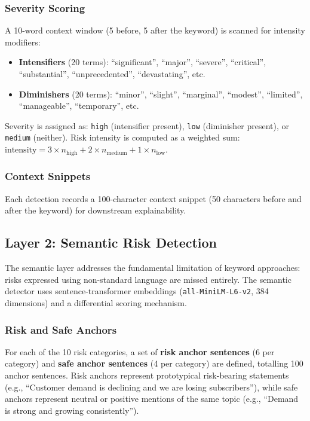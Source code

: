 \documentclass[12pt,a4paper]{article}
\begin{document}
\subsubsection{Severity Scoring}

A 10-word context window (5 before, 5 after the keyword) is scanned for intensity modifiers:
\begin{itemize}[noitemsep]
    \item \textbf{Intensifiers} (20 terms): ``significant'', ``major'', ``severe'', ``critical'', ``substantial'', ``unprecedented'', ``devastating'', etc.
    \item \textbf{Diminishers} (20 terms): ``minor'', ``slight'', ``marginal'', ``modest'', ``limited'', ``manageable'', ``temporary'', etc.
\end{itemize}

Severity is assigned as: \texttt{high} (intensifier present), \texttt{low} (diminisher present), or \texttt{medium} (neither). Risk intensity is computed as a weighted sum: $\text{intensity} = 3 \times n_{\text{high}} + 2 \times n_{\text{medium}} + 1 \times n_{\text{low}}$.

\subsubsection{Context Snippets}

Each detection records a 100-character context snippet (50 characters before and after the keyword) for downstream explainability.

\subsection{Layer 2: Semantic Risk Detection}

The semantic layer addresses the fundamental limitation of keyword approaches: risks expressed using non-standard language are missed entirely. The semantic detector uses sentence-transformer embeddings (\texttt{all-MiniLM-L6-v2}, 384 dimensions) and a differential scoring mechanism.

\subsubsection{Risk and Safe Anchors}

For each of the 10 risk categories, a set of \textbf{risk anchor sentences} (6 per category) and \textbf{safe anchor sentences} (4 per category) are defined, totalling 100 anchor sentences. Risk anchors represent prototypical risk-bearing statements (e.g., ``Customer demand is declining and we are losing subscribers''), while safe anchors represent neutral or positive mentions of the same topic (e.g., ``Demand is strong and growing consistently'').
\end{document}
